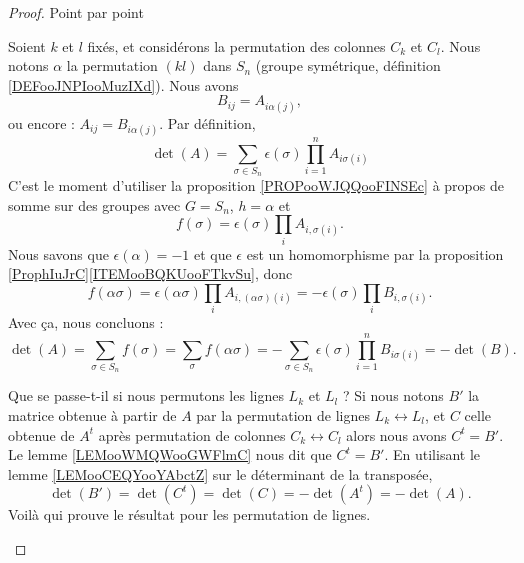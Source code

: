 \begin{proof}
	Point par point
	\begin{subproof}

		Soient \( k\) et \( l\) fixés, et considérons la permutation des colonnes \( C_k\) et \( C_l\). Nous notons \( \alpha\) la permutation \( (kl)\) dans \( S_n\) (groupe symétrique, définition \ref{DEFooJNPIooMuzIXd}). Nous avons
		\begin{equation}
			B_{ij}=A_{i \alpha(j)},
		\end{equation}
		ou encore : \( A_{ij}=B_{i\alpha(j)}\). Par définition,
		\begin{equation}
			\det(A)=\sum_{\sigma\in S_{n}}\epsilon(\sigma)\prod_{i=1}^nA_{i\sigma(i)}
		\end{equation}
		C'est le moment d'utiliser la proposition \ref{PROPooWJQQooFINSEc} à propos de somme sur des groupes avec \( G=S_n\), \( h=\alpha\) et
		\begin{equation}
			f(\sigma)=\epsilon(\sigma)\prod_iA_{i,\sigma(i)}.
		\end{equation}
		Nous savons que \( \epsilon(\alpha)=-1\) et que \( \epsilon\) est un homomorphisme par la proposition \ref{ProphIuJrC}\ref{ITEMooBQKUooFTkvSu}, donc
		\begin{equation}
			f(\alpha \sigma)=\epsilon(\alpha\sigma)\prod_iA_{i,(\alpha\sigma)(i)}=-\epsilon(\sigma)\prod_iB_{i,\sigma(i)}.
		\end{equation}
		Avec ça, nous concluons :
		\begin{equation}
			\det(A)=\sum_{\sigma\in S_n}f(\sigma)=\sum_{\sigma}f(\alpha \sigma)=-\sum_{\sigma\in S_n}\epsilon(\sigma)\prod_{i=1}^nB_{i\sigma(i)}=-\det(B).
		\end{equation}

		Que se passe-t-il si nous permutons les lignes \( L_k\) et \( L_{l}\) ? Si nous notons \( B'\) la matrice obtenue à partir de \( A\) par la permutation de lignes \( L_k\leftrightarrow L_l\), et \( C\) celle obtenue de \( A^t\) après permutation de colonnes \( C_k\leftrightarrow C_l\) alors nous avons \( C^t=B'\). Le lemme \ref{LEMooWMQWooGWFlmC} nous dit que \( C^t=B'\). En utilisant le lemme \ref{LEMooCEQYooYAbctZ} sur le déterminant de la transposée,
		\begin{equation}
			\det(B')=\det(C^t)=\det(C)=-\det(A^t)=-\det(A).
		\end{equation}
		Voilà qui prouve le résultat pour les permutation de lignes.


\end{subproof}
\end{proof}
